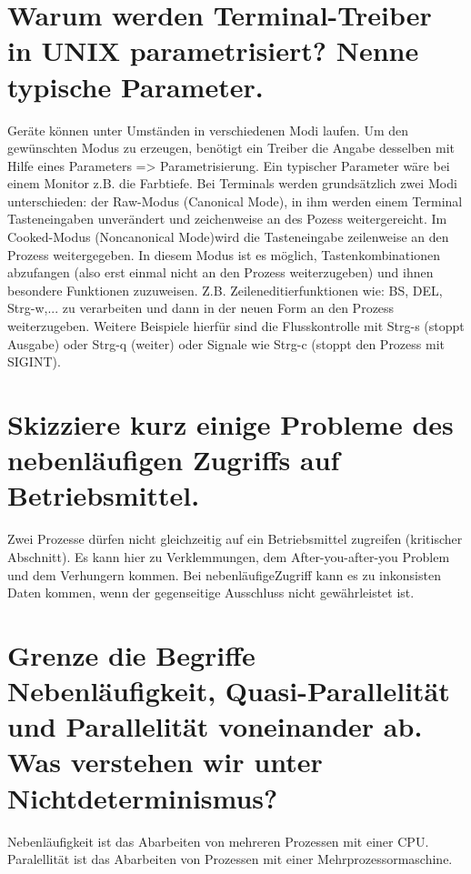 \documentclass[12pt,a4paper,ngerman]{scrartcl}
\newcommand{\question}[1]{#1}
\newenvironment {answer}
                {}
                {}
\begin{document}
\section{\question{Warum werden Terminal-Treiber in UNIX parametrisiert? Nenne typische Parameter.}}
\begin{answer}
Geräte können unter Umständen in verschiedenen Modi laufen. Um den gewünschten Modus zu
erzeugen, benötigt ein Treiber die Angabe desselben mit Hilfe eines Parameters => Parametrisierung.
Ein typischer Parameter wäre bei einem Monitor z.B. die Farbtiefe.
Bei Terminals werden grundsätzlich zwei Modi unterschieden: der Raw-Modus (Canonical Mode),
in ihm werden einem Terminal Tasteneingaben unverändert und zeichenweise an des Pozess
weitergereicht. Im Cooked-Modus (Noncanonical Mode)wird die Tasteneingabe zeilenweise an den
Prozess weitergegeben. In diesem Modus ist es möglich, Tastenkombinationen abzufangen (also
erst einmal nicht an den Prozess weiterzugeben) und ihnen besondere Funktionen zuzuweisen.
Z.B. Zeileneditierfunktionen wie: BS, DEL, Strg-w,... zu verarbeiten und dann in der neuen Form
an den Prozess weiterzugeben. Weitere Beispiele hierfür sind die Flusskontrolle mit Strg-s (stoppt
Ausgabe) oder Strg-q (weiter) oder Signale wie Strg-c (stoppt den Prozess mit SIGINT).
\end{answer}

\section{\question{Skizziere kurz einige Probleme des nebenläufigen Zugriffs auf Betriebsmittel.}}
\begin{answer}
Zwei Prozesse dürfen nicht gleichzeitig auf ein Betriebsmittel zugreifen (kritischer Abschnitt). Es
kann hier zu Verklemmungen, dem After-you-after-you Problem und dem Verhungern kommen.
Bei nebenläufigeZugriff kann es zu inkonsisten Daten kommen, wenn der gegenseitige Ausschluss
nicht gewährleistet ist.
\end{answer}

\section{\question{Grenze die Begriffe Nebenläufigkeit, Quasi-Parallelität und Parallelität voneinander ab. Was verstehen wir unter Nichtdeterminismus?}}
\begin{answer}
Nebenläufigkeit ist das Abarbeiten von mehreren Prozessen mit einer CPU. Paralellität ist das
Abarbeiten von Prozessen mit einer Mehrprozessormaschine.
\end{answer}
\end{document}
